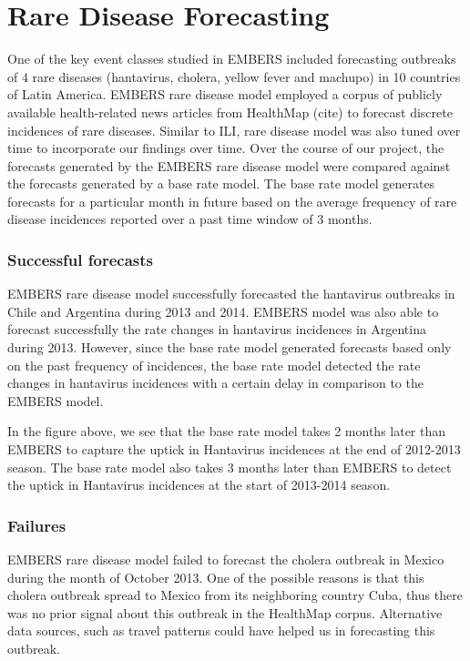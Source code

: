 \section{Rare Disease Forecasting}

One of the key event classes studied in EMBERS included forecasting outbreaks of $4$ rare diseases (hantavirus, cholera, yellow fever and machupo) in 10 countries of Latin America. EMBERS rare disease model employed a corpus of publicly available health-related news articles from HealthMap (cite) to forecast discrete incidences of rare diseases. Similar to ILI, rare disease model was also tuned over time to incorporate our findings over time. Over the course of our project, the forecasts generated by the EMBERS rare disease model were compared against the forecasts generated by a base rate model. The base rate model generates forecasts for a particular month in future based on the average frequency of rare disease incidences reported over a past time window of 3 months.


\subsubsection{Successful forecasts}

EMBERS rare disease model successfully forecasted the hantavirus outbreaks in Chile and Argentina during 2013 and 2014. EMBERS model was also able to forecast successfully the rate changes in hantavirus incidences in Argentina during 2013. However, since the base rate model generated forecasts based only on the past frequency of incidences, the base rate model detected the rate changes in hantavirus incidences with a certain delay in comparison to the EMBERS model. 


In the figure above, we see that the base rate model takes 2 months later than EMBERS to capture the uptick in Hantavirus incidences at the end of 2012-2013 season. The base rate model also takes 3 months later than EMBERS to detect the uptick in Hantavirus incidences at the start of 2013-2014 season. 


\subsubsection{Failures}

EMBERS rare disease model failed to forecast the cholera outbreak in Mexico during the month of October 2013. One of the possible reasons is that this cholera outbreak spread to Mexico from its neighboring country Cuba, thus there was no prior signal about this outbreak in the HealthMap corpus. Alternative data sources, such as travel patterns could have helped us in forecasting this outbreak.

